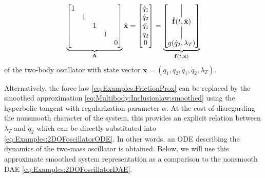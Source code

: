 \documentclass[a4paper, nonatbib, 3p, twocolumn]{elsarticle}
\theoremstyle{plain}
\theoremstyle{definition}
\theoremstyle{remark}
\newcommand{\vf}{\mathbf f}
\newcommand{\vx}{\mathbf x}
\newcommand{\vA}{\mathbf A}
\begin{document}
\begin{equation}\label{eq:Examples:2DOFoscillatorDAE}
		\underbrace{\begin{bmatrix}
			1&&&&\\
			&1&&&\\
			&&1&&\\
			&&&1&\\
			&&&&0\\
	\end{bmatrix}}_\vA\dot{\vx}=\begin{bmatrix}
		\dot{q}_1\\
		\dot{q}_2\\
		\ddot{q_1}\\
		\ddot{q_2}\\
		0
	\end{bmatrix} = \underbrace{\begin{bmatrix}
		 \vrule\\[6pt]
		 \tilde{\vf}(t,\tilde{\vx}) \\
		 \vrule\\[6pt]
		 g(\dot{q}_2, \lambda_T)
		\end{bmatrix}}_{\vf(t,\vx)}
\end{equation}
of the two-body oscillator with state vector $\vx = (q_1,q_2,\dot{q}_1,\dot{q}_2,\lambda_T)$.

Alternatively, the force law \eqref{eq:Examples:FrictionProx} can be replaced by the smoothed approximation \eqref{eq:Multibody:Inclusionlaw:smoothed} using the hyperbolic tangent with regularization parameter $\alpha$. At the cost of disregarding the nonsmooth character of the system, this provides an explicit relation between $\lambda_T$ and $\dot{q}_2$ which can be directly substituted into \eqref{eq:Examples:2DOFoscillatorODE}. In other words, an ODE describing the dynamics of the two-mass oscillator is obtained. Below, we will use this approximate smoothed system representation as a comparison to the nonsmooth DAE \eqref{eq:Examples:2DOFoscillatorDAE}.
\end{document}
